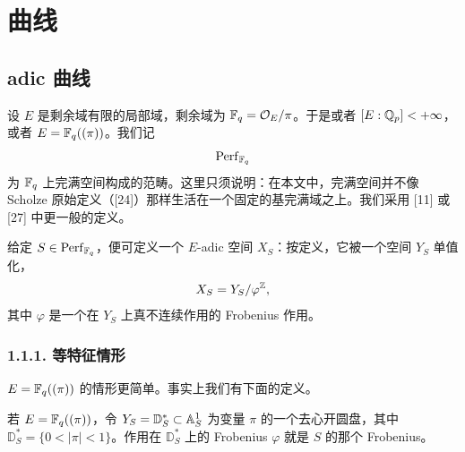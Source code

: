 

\section{曲线}%
\setcounter{equation}{0}%

\subsection{adic 曲线}%

\leavevmode{}设 $E$ 是剩余域有限的局部域，剩余域为 $\FF_q=\oo_E/\pi$。于是或者 $[E:\QQ_p]<+\infty$，或者 $E=\FF_q((\pi))$。我们记
\[
  \mathrm{Perf}_{\FF_q}
\]
为 $\FF_q$ 上完满空间构成的范畴。这里只须说明：在本文中，完满空间并不像 Scholze 原始定义（[24]）那样生活在一个固定的基完满域之上。我们采用 [11] 或 [27] 中更一般的定义。

给定 $S\in\mathrm{Perf}_{\FF_q}$，便可定义一个 $E$-adic 空间 $X_S$：按定义，它被一个空间 $Y_S$ 单值化，
\[
  X_S=Y_S/\varphi^\ZZ,
\]
其中 $\varphi$ 是一个在 $Y_S$ 上真不连续作用的 Frobenius 作用。

\subsubsection*{1.1.1. 等特征情形}%

$E=\FF_q((\pi))$ 的情形更简单。事实上我们有下面的定义。

\begin{definition}\label{def:1.1}
若 $E=\FF_q((\pi))$，令 $Y_S=\mathbb{D}^*_S\subset\AA^1_S$ 为变量 $\pi$ 的一个去心开圆盘，其中 $\mathbb{D}^*_S=\{0<|\pi|<1\}$。作用在 $\mathbb{D}^*_S$ 上的 Frobenius $\varphi$ 就是 $S$ 的那个 Frobenius。
\end{definition}

